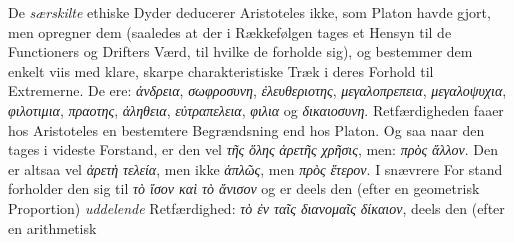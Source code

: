 \documentclass[12pt,a4paper]{book}
\newcommand{\gk}[1]{\textit{#1}}
\begin{document}
De \emph{særskilte} ethiske Dyder deducerer Aristoteles ikke,
som Platon havde gjort, men opregner dem (saaledes at der i
Rækkefølgen tages et Hensyn til de Functioners og Drifters
Værd, til hvilke de forholde sig), og bestemmer dem enkelt\-%
viis med klare, skarpe charakteristiske Træk i deres Forhold
til Extremerne. De ere: \gk{ἀνδρεια}, \gk{σωφροσυνη}, \gk{ἐλευθεριοτης},
\gk{μεγαλοπρεπεια}, \gk{μεγαλοψυχια}, \gk{φιλοτιμια}, \gk{πραοτης}, \gk{ἀληθεια},
\gk{εὐτραπελεια}, \gk{φιλια} og \gk{δικαιοσυνη}. Retfærdigheden faaer hos
Aristoteles en bestemtere Begrændsning end hos Platon. Og\-%
saa naar den tages i videste Forstand, er den vel \gk{τῆς} \emph{\gk{ὅλης}}
\gk{ἀρετῆς χρῆσις}, men: \emph{\gk{πρὸς ἄλλον}}. Den er altsaa vel \gk{ἀρετὴ}
\gk{τελεία}, men ikke \gk{ἁπλῶς}, men \gk{πρὸς ἕτερον}. I snævrere For\-%
stand forholder den sig til \gk{τὸ ἴσον καὶ τὸ ἄνισον} og er deels
den (efter en geometrisk Proportion) \emph{uddelende} Retfærdighed:
\gk{τὸ ἐν ταῖς διανομαῖς δίκαιον}, deels den (efter en arithmetisk
\end{document}
